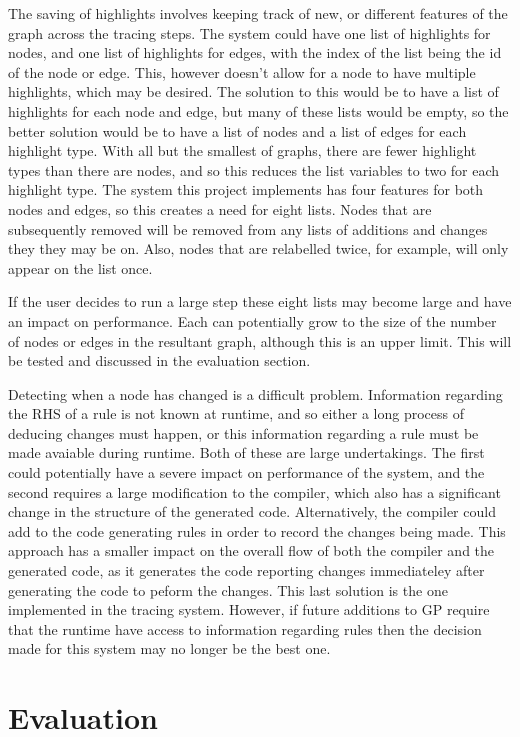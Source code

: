 \documentclass{UoYCSproject}
\begin{document}
The saving of highlights involves keeping track of new, or different features of the graph across the tracing steps. The system could have one list of highlights for nodes, and one list of highlights for edges, with the index of the list being the id of the node or edge. This, however doesn't allow for a node to have multiple highlights, which may be desired. The solution to this would be to have a list of highlights for each node and edge, but many of these lists would be empty, so the better solution would be to have a list of nodes and a list of edges for each highlight type. With all but the smallest of graphs, there are fewer highlight types than there are nodes, and so this reduces the list variables to two for each highlight type. The system this project implements has four features for both nodes and edges, so this creates a need for eight lists. Nodes that are subsequently removed will be removed from any lists of additions and changes they they may be on. Also, nodes that are relabelled twice, for example, will only appear on the list once.

If the user decides to run a large step these eight lists may become large and have an impact on performance. Each can potentially grow to the size of the number of nodes or edges in the resultant graph, although this is an upper limit. This will be tested and discussed in the evaluation section.

Detecting when a node has changed is a difficult problem. Information regarding the RHS of a rule is not known at runtime, and so either a long process of deducing changes must happen, or this information regarding a rule must be made avaiable during runtime. Both of these are large undertakings. The first could potentially have a severe impact on performance of the system, and the second requires a large modification to the compiler, which also has a significant change in the structure of the generated code. Alternatively, the compiler could add to the code generating rules in order to record the changes being made. This approach has a smaller impact on the overall flow of both the compiler and the generated code, as it generates the code reporting changes immediateley after generating the code to peform the changes. This last solution is the one implemented in the tracing system. However, if future additions to GP require that the runtime have access to information regarding rules then the decision made for this system may no longer be the best one.

\chapter{Evaluation}
\end{document}
